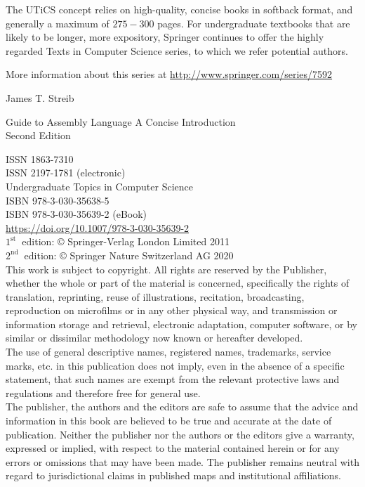 \documentclass[10pt]{book}
\begin{document}
The UTiCS concept relies on high-quality, concise books in softback format, and generally a maximum of $275-300$ pages. For undergraduate textbooks that are likely to be longer, more expository, Springer continues to offer the highly regarded Texts in Computer Science series, to which we refer potential authors.

More information about this series at \href{http://www.springer.com/series/7592}{http://www.springer.com/series/7592}


James T. Streib

Guide to Assembly Language
A Concise Introduction\\
Second Edition


ISSN 1863-7310\\
ISSN 2197-1781 (electronic)\\
Undergraduate Topics in Computer Science\\
ISBN 978-3-030-35638-5\\
ISBN 978-3-030-35639-2 (eBook)\\
\href{https://doi.org/10.1007/978-3-030-35639-2}{https://doi.org/10.1007/978-3-030-35639-2}\\
$1^{\text {st }}$ edition: © Springer-Verlag London Limited 2011\\
$2^{\text {nd }}$ edition: © Springer Nature Switzerland AG 2020\\
This work is subject to copyright. All rights are reserved by the Publisher, whether the whole or part of the material is concerned, specifically the rights of translation, reprinting, reuse of illustrations, recitation, broadcasting, reproduction on microfilms or in any other physical way, and transmission or information storage and retrieval, electronic adaptation, computer software, or by similar or dissimilar methodology now known or hereafter developed.\\
The use of general descriptive names, registered names, trademarks, service marks, etc. in this publication does not imply, even in the absence of a specific statement, that such names are exempt from the relevant protective laws and regulations and therefore free for general use.\\
The publisher, the authors and the editors are safe to assume that the advice and information in this book are believed to be true and accurate at the date of publication. Neither the publisher nor the authors or the editors give a warranty, expressed or implied, with respect to the material contained herein or for any errors or omissions that may have been made. The publisher remains neutral with regard to jurisdictional claims in published maps and institutional affiliations.
\end{document}
